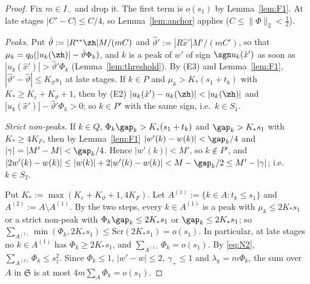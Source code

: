 \begin{proof}
Fix $m\in I_-$ and drop it.  The first term is $o(s_1)$ by
Lemma~\ref{lem:F1}.  At late stages $|C'-C|\le C/4$, so
Lemma~\ref{lem:anchor} applies ($C\le\|\Phi\|_2<\frac12$).

\emph{Peaks.}  Put $\hat\vartheta:=|R^{**}\zh|M/(mC)$ and $\hat\vartheta':=
|R\hat x'|M'/(mC')$, so that $\mu_k=q_0(|u_k(\zh)|-\hat\vartheta\Phi_k)$, and
$k$ is a peak of $w'$ of sign $\sgn u_k(\hat x')$ as soon as
$|u_k(\hat x')|>\hat\vartheta'\Phi_k$ (Lemma~\ref{lem:threshold}).  By (E3)
and Lemma~\ref{lem:F1}, $|\hat\vartheta'-\hat\vartheta|\le K_\vartheta s_1$
at late stages.  If $k\in P$ and $\mu_k>K_*(s_1+t_k)$ with $K_*\ge
K_e+K_\vartheta+1$, then by (E2) $|u_k(\hat x')-u_k(\zh)|<|u_k(\zh)|$ and
$|u_k(\hat x')|-\hat\vartheta'\Phi_k>0$; so $k\in P'$ with the same sign,
i.e.\ $k\in S_1$.

\emph{Strict non-peaks.}  If $k\in Q$, $\Phi_k\gap_k>K_*(s_1+t_k)$ and
$\gap_k>K_*s_1$ with $K_*\ge4K_F$, then by Lemma~\ref{lem:F1}
$|w'(k)-w(k)|<\gap_k/4$ and $|\gamma|=|M'-M|<\gap_k/4$.  Hence $|w'(k)|<M'$,
so $k\notin P'$, and $|2w'(k)-w(k)|\le|w(k)|+2|w'(k)-w(k)|<M-\gap_k/2\le
M'-|\gamma|$; i.e.\ $k\in S_2$.

Put $K_*:=\max(K_e+K_\vartheta+1,4K_F)$.  Let $A^{(1)}:=\{k\in A:t_k\le
s_1\}$ and $A^{(2)}:=A\setminus A^{(1)}$.  By the two steps, every $k\in
A^{(1)}$ is a peak with $\mu_k\le2K_*s_1$ or a strict non-peak with
$\Phi_k\gap_k\le2K_*s_1$ or $\gap_k\le2K_*s_1$; so
$\sum_{A^{(1)}}\min(\Phi_k,2K_*s_1)\le\mathrm{Scr}(2K_*s_1)=o(s_1)$.  In
particular, at late stages no $k\in A^{(1)}$ has $\Phi_k\ge2K_*s_1$, and
$\sum_{A^{(1)}}\Phi_k=o(s_1)$.  By \eqref{eq:N2}, $\sum_{A^{(2)}}\Phi_k\le
s_1^2$.  Since $\Phi_k\le1$, $|w'-w|\le2$, $\gamma_+\le1$ and
$\lambda_k=m\Phi_k$, the sum over $A$ in $\mathfrak S$ is at most
$4m\sum_A\Phi_k=o(s_1)$.
\end{proof}
